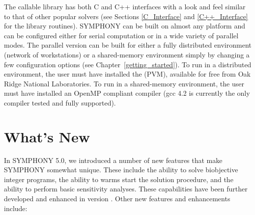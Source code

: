 The callable library has both C and C++ interfaces with a look and feel
similar to that of other popular solvers (see Sections \ref{C_Interface} and
\ref{C++_Interface} for the library routines). SYMPHONY can be built on almost
any platform and can be configured either for serial computation or in a wide
variety of parallel modes. The parallel version can be built for either a
fully distributed environment (network of workstations) or a shared-memory
environment simply by changing a few configuration options (see
Chapter~\ref{getting_started}). To run in a distributed environment, the user
must have installed the {\em {}} (PVM), available for free from Oak
Ridge National Laboratories. To run in a shared-memory environment, the user
must have installed an OpenMP compliant compiler (gcc 4.2 is currently the
only compiler tested and fully supported).

\section{What's New}

In SYMPHONY 5.0, we introduced a number of new features that make SYMPHONY
somewhat unique. These include the ability to solve biobjective integer
programs, the ability to warms start the solution procedure, and the ability
to perform basic sensitivity analyses. These capabilities have been further
developed and enhanced in version \VER. Other new features and enhancements
include:


